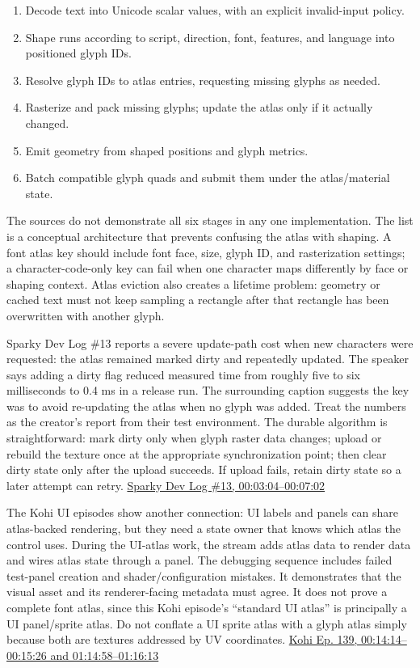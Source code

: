 \begin{enumerate}
\def\labelenumi{\arabic{enumi}.}
\tightlist
\item
  Decode text into Unicode scalar values, with an explicit invalid-input policy.
\item
  Shape runs according to script, direction, font, features, and language into positioned glyph IDs.
\item
  Resolve glyph IDs to atlas entries, requesting missing glyphs as needed.
\item
  Rasterize and pack missing glyphs; update the atlas only if it actually changed.
\item
  Emit geometry from shaped positions and glyph metrics.
\item
  Batch compatible glyph quads and submit them under the atlas/material state.
\end{enumerate}

The sources do not demonstrate all six stages in any one implementation. The list is a conceptual architecture that prevents confusing the atlas with shaping. A font atlas key should include font face, size, glyph ID, and rasterization settings; a character-code-only key can fail when one character maps differently by face or shaping context. Atlas eviction also creates a lifetime problem: geometry or cached text must not keep sampling a rectangle after that rectangle has been overwritten with another glyph.

Sparky Dev Log \#13 reports a severe update-path cost when new characters were requested: the atlas remained marked dirty and repeatedly updated. The speaker says adding a dirty flag reduced measured time from roughly five to six milliseconds to 0.4 ms in a release run. The surrounding caption suggests the key was to avoid re-updating the atlas when no glyph was added. Treat the numbers as the creator's report from their test environment. The durable algorithm is straightforward: mark dirty only when glyph raster data changes; upload or rebuild the texture once at the appropriate synchronization point; then clear dirty state only after the upload succeeds. If upload fails, retain dirty state so a later attempt can retry. \href{https://www.youtube.com/watch?v=njTgcayfhJU&t=3m4s}{Sparky Dev Log \#13, 00:03:04--00:07:02}

The Kohi UI episodes show another connection: UI labels and panels can share atlas-backed rendering, but they need a state owner that knows which atlas the control uses. During the UI-atlas work, the stream adds atlas data to render data and wires atlas state through a panel. The debugging sequence includes failed test-panel creation and shader/configuration mistakes. It demonstrates that the visual asset and its renderer-facing metadata must agree. It does not prove a complete font atlas, since this Kohi episode's ``standard UI atlas'' is principally a UI panel/sprite atlas. Do not conflate a UI sprite atlas with a glyph atlas simply because both are textures addressed by UV coordinates. \href{https://www.youtube.com/watch?v=-V5z1bVjl_c&t=14m14s}{Kohi Ep. 139, 00:14:14--00:15:26 and 01:14:58--01:16:13}

